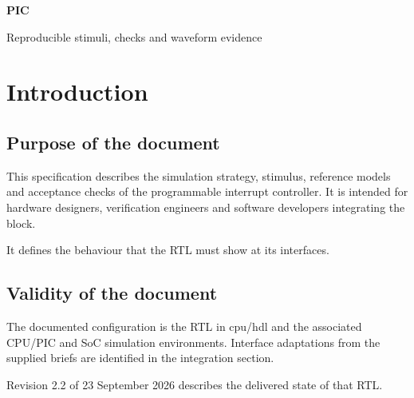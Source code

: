 \documentclass[11pt]{article}
\begin{document}
\begin{titlepage}\vspace*{24mm}
{\Huge\bfseries\color{accent}PIC\par}\vspace{4mm}{\LARGE Verification Specification\par}\vspace{12mm}
{\Large Reproducible stimuli, checks and waveform evidence\par}\vfill
{}\end{titlepage}
\tableofcontents
\clearpage
\section{Introduction}

\subsection{Purpose of the document}
\noindent This specification describes the simulation strategy, stimulus, reference models and acceptance checks of the programmable interrupt controller. It is intended for hardware designers, verification engineers and software developers integrating the block.\par\medskip
\noindent It defines the behaviour that the RTL must show at its interfaces.\par\medskip

\subsection{Validity of the document}
\noindent The documented configuration is the RTL in cpu/hdl and the associated CPU/PIC and SoC simulation environments. Interface adaptations from the supplied briefs are identified in the integration section.\par\medskip
\noindent Revision 2.2 of 23 September 2026 describes the delivered state of that RTL.\par\medskip

\end{document}
